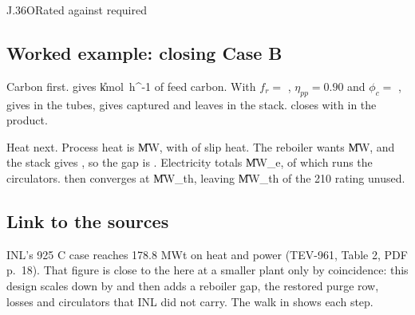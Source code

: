 \begin{eqcard}{J.36}{O}{Rated against required}
\end{eqcard}

\subsection*{Worked example: closing Case B}
Carbon first.  gives \cFeedC{} \U{kmol\ h^{-1}} of feed carbon. With $f_r=$ \vFr, $\eta_{pp}=0.90$ and $\phi_c=$ \vPhiC,  gives \cTubeC{} in the tubes,  gives \cCapC{} captured and  leaves \cBurnC{} in the stack.  closes with \cProdC{} in the product.

Heat next. Process heat is \vQprocxB{} \U{MW}, with \vQrecB{} of slip heat. The reboiler wants \vQrebB{} \U{MW}, and the stack gives \vQstackB, so the gap is \vQgapxB. Electricity totals \vEtotB{} \U{MW_e}, of which \vEcircB{} runs the circulators.  then converges at \vQRxB{} \U{MW_{th}}, leaving \vSpareB{} \U{MW_{th}} of the 210 rating unused.

\subsection*{Link to the sources}
INL's 925 C case reaches 178.8 MWt on heat and power (TEV-961, Table 2, PDF p.~18). That figure is close to the \vQRB{} here at a smaller plant only by coincidence: this design scales down by \vScaleB{} and then adds a reboiler gap, the restored purge row, losses and circulators that INL did not carry. The walk in  shows each step.
